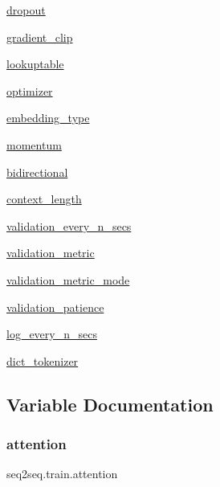 \begin{DoxyCompactItemize}
\hyperlink{namespaceseq2seq_1_1train_a6ce0f888cec4261959cc61cc80a5cfd4}{dropout}
\item 
\hyperlink{namespaceseq2seq_1_1train_ac8c6c64d90fd2d682a86cdbd893dd895}{gradient\+\_\+clip}
\item 
\hyperlink{namespaceseq2seq_1_1train_a49f7da1b71bd20017774f8c6b8884676}{lookuptable}
\item 
\hyperlink{namespaceseq2seq_1_1train_ab303e1582310ef62604d70c938bfe563}{optimizer}
\item 
\hyperlink{namespaceseq2seq_1_1train_ae607c209cdec45923aaeef6318debcf2}{embedding\+\_\+type}
\item 
\hyperlink{namespaceseq2seq_1_1train_a1714428a81ed90a740bde11d172768ea}{momentum}
\item 
\hyperlink{namespaceseq2seq_1_1train_a84bf6d2d896ec47ce289872a962a71f8}{bidirectional}
\item 
\hyperlink{namespaceseq2seq_1_1train_affd05b2237eb3f4e203a59be06cfc14d}{context\+\_\+length}
\item 
\hyperlink{namespaceseq2seq_1_1train_ad886940ebda001e78047c43e99838fe8}{validation\+\_\+every\+\_\+n\+\_\+secs}
\item 
\hyperlink{namespaceseq2seq_1_1train_a4cb6f12de71de9753db0e582aa95b55c}{validation\+\_\+metric}
\item 
\hyperlink{namespaceseq2seq_1_1train_a06e04c7f720b926c72043de45d55587b}{validation\+\_\+metric\+\_\+mode}
\item 
\hyperlink{namespaceseq2seq_1_1train_aaa30160a61d83c6432812a34488992ee}{validation\+\_\+patience}
\item 
\hyperlink{namespaceseq2seq_1_1train_ace1af0772a478f538d5156ce5758a73a}{log\+\_\+every\+\_\+n\+\_\+secs}
\item 
\hyperlink{namespaceseq2seq_1_1train_a6473fc025953ca7d5207631fd967d865}{dict\+\_\+tokenizer}
\end{DoxyCompactItemize}


\subsection{Variable Documentation}
\mbox{\label{namespaceseq2seq_1_1train_a9fe719271e349a4677bcd56cfa75f9dc}} 
\subsubsection{\texorpdfstring{attention}{attention}}
{\footnotesize\ttfamily seq2seq.\+train.\+attention}


